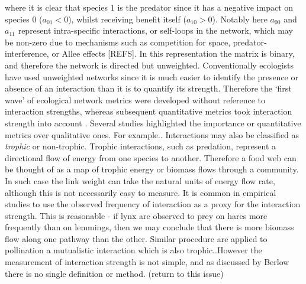 where it is clear that species 1 is the predator since it has a negative impact on species 0 ($a_{01}<0$), whilst receiving benefit itself ($a_{10}>0$). Notably here $a_{00}$ and $a_{11}$ represent intra-specific interactions, or self-loops in the network, which may be non-zero due to mechanisms such as competition for space, predator-interference, or Allee effects [REFS]. In this representation the matrix is binary, and therefore the network is directed but unweighted. Conventionally ecologists have used unweighted networks since it is much easier to identify the presence or absence of an interaction than it is to quantify its strength. Therefore the `first wave' of ecological network metrics were developed without reference to interaction strengths, whereas subsequent quantitative metrics took interaction strength into account \cite{bersier2002quantitative}. Several studies highlighted the importance or quantitative metrics over qualitative ones. For example.. Interactions may also be classified as \emph{trophic} or non-trophic. Trophic interactions, such as predation, represent a directional flow of energy from one species to another. Therefore a food web can be thought of as a map of trophic energy or biomass flows through a community. In such case the link weight can take the natural units of energy flow rate, although this is not necessarily easy to measure. It is common in empirical studies to use the observed frequency of interaction as a proxy for the interaction strength. This is reasonable - if lynx are observed to prey on hares more frequently than on lemmings, then we may conclude that there is more biomass flow along one pathway than the other. Similar procedure are applied to pollination a mutualistic interaction which is also trophic..However the measurement of interaction strength is not simple, and as discussed by Berlow \cite{berlow2004interaction} there is no single definition or method. (return to this issue)


